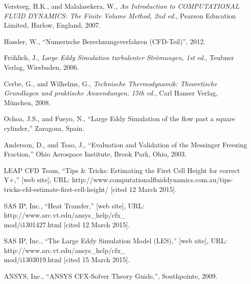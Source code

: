 \begin{thebibliography}{9}
Versteeg, H.K., and Malalasekera, W., \emph{An Introduction to COMPUTATIONAL FLUID DYNAMICS: The Finite Volume Method, 2nd ed.}, Pearson Education Limited, Harlow, England, 2007.

Hassler, W., ``Numerische Berechnungsverfahren (CFD-Teil)'', 2012.

Fröhlich, J., \emph{Large Eddy Simulation turbulenter Strömungen, 1st ed.}, Teubner Verlag, Wiesbaden, 2006.

Cerbe, G., and Wilhelms, G., \emph{Technische Thermodynamik: Theoretische Grundlagen und praktische Anwendungen, 15th ed.}, Carl Hanser Verlag, München, 2008.

Ochoa, J.S., and Fueyo, N., ``Large Eddy Simulation of the flow past a square cylinder,'' Zaragoza, Spain.

Anderson, D., and Tsao, J., ``Evaluation and Validation of the Messinger Freezing Fraction,'' Ohio Aerospace Institute, Brook Park, Ohio, 2003.

LEAP CFD Team, ``Tips \& Tricks: Estimating the First Cell Height for correct Y+,'' [web site], URL: http://www.computationalfluiddynamics.com.au/tips-tricks-cfd-estimate-first-cell-height/ [cited 12 March 2015].

SAS IP, Inc., ``Heat Transfer,'' [web site], URL: http://www.arc.vt.edu/ansys\_help/cfx\_\\mod/i1301427.html [cited 12 March 2015].

SAS IP, Inc., ``The Large Eddy Simulation Model (LES),'' [web site], URL: http://www.arc.vt.edu/ansys\_help/cfx\_\\mod/i1303019.html [cited 15 March 2015].

ANSYS, Inc., ``ANSYS CFX-Solver Theory Guide,'', Southpointe, 2009.

\end{thebibliography}
